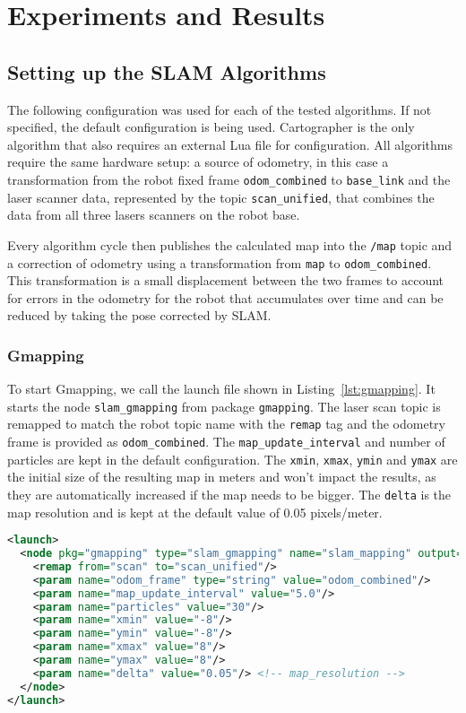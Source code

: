 \chapter{Experiments and Results}\label{chp:results}

\section{Setting up the SLAM Algorithms}\label{sec:slam}

The following configuration was used for each of the tested algorithms. If not specified, the default configuration is being used. Cartographer is the only algorithm that also requires an external Lua file for configuration. All algorithms require the same hardware setup: a source of odometry, in this case a transformation from the robot fixed frame \texttt{odom\_combined} to \texttt{base\_link} and the laser scanner data, represented by the topic \texttt{scan\_unified}, that combines the data from all three lasers scanners on the robot base.

Every algorithm cycle then publishes the calculated map into the \texttt{/map} topic and a correction of odometry using a transformation from \texttt{map} to \texttt{odom\_combined}. This transformation is a small displacement between the two frames to account for errors in the odometry for the robot that accumulates over time and can be reduced by taking the pose corrected by SLAM.

\subsection{Gmapping}

To start Gmapping, we call the launch file shown in Listing~\ref{lst:gmapping}. It starts the node \texttt{slam\_gmapping} from package \texttt{gmapping}. The laser scan topic is remapped to match the robot topic name with the \texttt{remap} tag and the odometry frame is provided as \texttt{odom\_combined}. The \texttt{map\_update\_interval} and number of particles are kept in the default configuration. The \texttt{xmin}, \texttt{xmax}, \texttt{ymin} and \texttt{ymax} are the initial size of the resulting map in meters and won't impact the results, as they are automatically increased if the map needs to be bigger. The \texttt{delta} is the map resolution and is kept at the default value of 0.05 pixels/meter.

\begin{lstlisting}[caption={Gmapping launch file.},label={lst:gmapping},language=XML]
<launch>
  <node pkg="gmapping" type="slam_gmapping" name="slam_mapping" output="screen">
    <remap from="scan" to="scan_unified"/>
    <param name="odom_frame" type="string" value="odom_combined"/>
    <param name="map_update_interval" value="5.0"/>
    <param name="particles" value="30"/>
    <param name="xmin" value="-8"/>
    <param name="ymin" value="-8"/>
    <param name="xmax" value="8"/>
    <param name="ymax" value="8"/>
    <param name="delta" value="0.05"/> <!-- map_resolution -->
  </node>
</launch>
\end{lstlisting}


